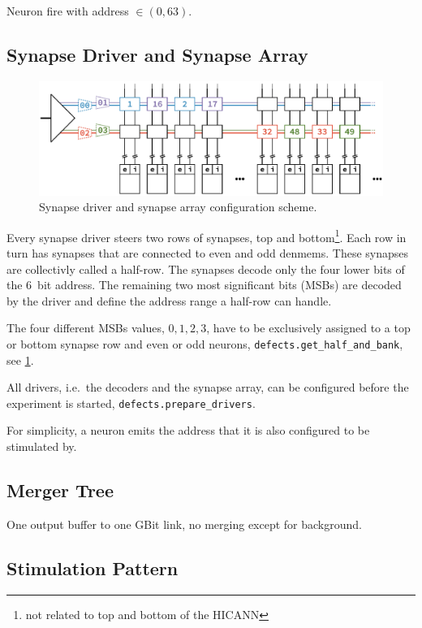 \documentclass[a4paper]{article}
\newcommand{\func}[1]{\lstinline!#1!}
\begin{document}
Neuron fire with address $\in (0, 63)$.

\subsection{Synapse Driver and Synapse Array}

\begin{figure}
  \centering
  \includegraphics[width=\textwidth]{figures/syndrv_cfg}
  \caption{Synapse driver and synapse array configuration scheme.}
  \label{fig:syndrv_cfg}
\end{figure}

Every synapse driver steers two rows of synapses, top and
bottom\footnote{not related to top and bottom of the HICANN}. Each row
in turn has synapses that are connected to even and odd denmems. These
synapses are collectivly called a half-row. The synapses decode only
the four lower bits of the 6~bit address. The remaining two most
significant bits (MSBs) are decoded by the driver and define the
address range a half-row can handle.

The four different MSBs values, $0,1,2,3$, have to be exclusively
assigned to a top or bottom synapse row and even or odd neurons,
\func{defects.get_half_and_bank}, see \cref{fig:syndrv_cfg}.

All drivers, i.e.\ the decoders and the synapse array, can be
configured before the experiment is started,
\func{defects.prepare_drivers}.

For simplicity, a neuron emits the address that it is also configured
to be stimulated by.

\subsection{Merger Tree}

One output buffer to one GBit link, no merging except for background.

\subsection{Stimulation Pattern}
\end{document}
